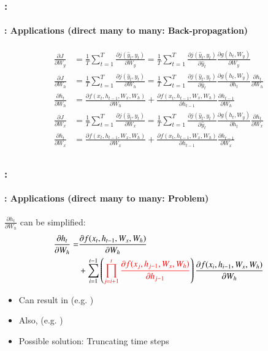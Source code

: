 \documentclass[xcolor=table]{beamer}
\begin{document}
\begin{frame}
	\frametitle{\insertshortsubtitle: \insertsection}
	\framesubtitle{\insertsubsection: Applications (direct many to many: Back-propagation)}
	
	\begin{align*}
		\frac{\partial J}{\partial W_y} & =
		\frac{1}{T} \sum_{t=1}^{T} \frac{\partial j(\hat{y}_t, y_t)}{\partial W_y}
		= \frac{1}{T} \sum_{t=1}^{T} \frac{\partial j(\hat{y}_t, y_t)}{\partial \hat{y}_t} 
		\frac{\partial g(h_t, W_y)}{\partial W_y} \\
%		
		\frac{\partial J}{\partial W_h} & = \frac{1}{T} \sum_{t=1}^{T} \frac{\partial j(\hat{y}_t, y_t)}{\partial W_h}
		= \frac{1}{T} \sum_{t=1}^{T} \frac{\partial j(\hat{y}_t, y_t)}{\partial \hat{y}_t} 
		\frac{\partial g(h_t, W_y)}{\partial h_t} 
		\frac{\partial h_t}{\partial W_h} \\
		\frac{\partial h_t}{\partial W_h} & = 
		\frac{\partial f(x_t, h_{t-1}, W_x, W_h)}{\partial W_h} + 
		\frac{\partial f(x_t, h_{t-1}, W_x, W_h)}{\partial h_{t-1}} \frac{\partial h_{t-1}}{\partial W_h} \\
%		
		\frac{\partial J}{\partial W_x} & = 
		\frac{1}{T} \sum_{t=1}^{T} \frac{\partial j(\hat{y}_t, y_t)}{\partial W_x}
		= \frac{1}{T} \sum_{t=1}^{T} \frac{\partial j(\hat{y}_t, y_t)}{\partial \hat{y}_t} 
		\frac{\partial g(h_t, W_y)}{\partial h_t} 
		\frac{\partial h_t}{\partial W_x} \\
		\frac{\partial h_t}{\partial W_x} & = 
		\frac{\partial f(x_t, h_{t-1}, W_x, W_h)}{\partial W_x} + 
		\frac{\partial f(x_t, h_{t-1}, W_x, W_h)}{\partial h_{t-1}} \frac{\partial h_{t-1}}{\partial W_x} \\
	\end{align*}
	
\end{frame}

\begin{frame}
	\frametitle{\insertshortsubtitle: \insertsection}
	\framesubtitle{\insertsubsection: Applications (direct many to many: Problem)}
	$\frac{\partial h_t}{\partial W_h}$ can be simplified:
	\begin{align*}
	\frac{\partial h_t}{\partial W_h}  = &
	\frac{\partial f(x_t, h_{t-1}, W_x, W_h)}{\partial W_h} \\
	& + 
	\sum_{i=1}^{t-1} \left( {\color{red} \prod_{j=i+1}^{t} \frac{\partial f(x_j, h_{j-1}, W_x, W_h)}{\partial h_{j-1}}} \right)
	\frac{\partial f(x_i, h_{i-1}, W_x, W_h)}{\partial W_h}\\
	\end{align*}
	
	\begin{itemize}
		\item Can result in  (e.g. )
		\item Also,  (e.g. )
		\item Possible solution: Truncating time steps \cite{2002-jaeger}
	\end{itemize}
	
\end{frame}
\end{document}
